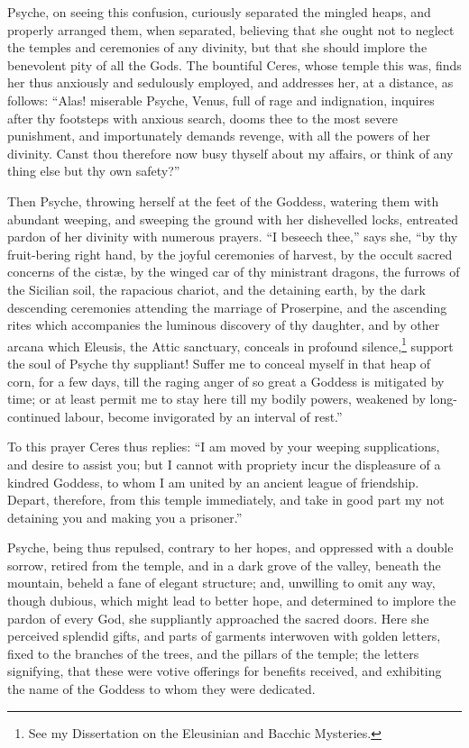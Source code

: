 \documentclass{article}
\begin{document}
Psyche, on seeing this confusion, curiously separated the mingled heaps, and
properly arranged them, when separated, believing that she ought not to neglect
the temples and ceremonies of any divinity, but that she should implore the
benevolent pity of all the Gods. The bountiful Ceres, whose temple this was,
finds her thus anxiously and sedulously employed, and addresses her, at a
distance, as follows: ``Alas! miserable Psyche, Venus, full of rage and
indignation, inquires after thy footsteps with anxious search, dooms thee to
the most severe punishment, and importunately demands revenge, with all the
powers of her divinity. Canst thou therefore now busy thyself about my affairs,
or think of any thing else but thy own safety?''

Then Psyche, throwing herself at the feet of the Goddess, watering them with
abundant weeping, and sweeping the ground with her dishevelled locks, entreated
pardon of her divinity with numerous prayers. ``I beseech thee,'' says she,
``by thy fruit-bering right hand, by the joyful ceremonies of harvest, by the
occult sacred concerns of the cist{\ae}, by the winged car of thy ministrant
dragons, the furrows of the Sicilian soil, the rapacious chariot, and the
detaining earth, by the dark descending ceremonies attending the marriage of
Proserpine, and the ascending rites which accompanies the luminous discovery of
thy daughter, and by other arcana which Eleusis, the Attic sanctuary, conceals
in profound silence,\footnote{See my Dissertation on the Eleusinian and Bacchic
Mysteries.} support the soul of Psyche thy suppliant! Suffer me to conceal
myself in that heap of corn, for a few days, till the raging anger of so great
a Goddess is mitigated by time; or at least permit me to stay here till my
bodily powers, weakened by long-continued labour, become invigorated by an
interval of rest.''

To this prayer Ceres thus replies: ``I am moved by your weeping supplications,
and desire to assist you; but I cannot with propriety incur the displeasure of
a kindred Goddess, to whom I am united by an ancient league of friendship.
Depart, therefore, from this temple immediately, and take in good part my not
detaining you and making you a prisoner.''

Psyche, being thus repulsed, contrary to her hopes, and oppressed with a double
sorrow, retired from the temple, and in a dark grove of the valley, beneath the
mountain, beheld a fane of elegant structure; and, unwilling to omit any way,
though dubious, which might lead to better hope, and determined to implore the
pardon of every God, she suppliantly approached the sacred doors. Here she
perceived splendid gifts, and parts of garments interwoven with golden letters,
fixed to the branches of the trees, and the pillars of the temple; the letters
signifying, that these were votive offerings for benefits received, and
exhibiting the name of the Goddess to whom they were dedicated.
\end{document}
